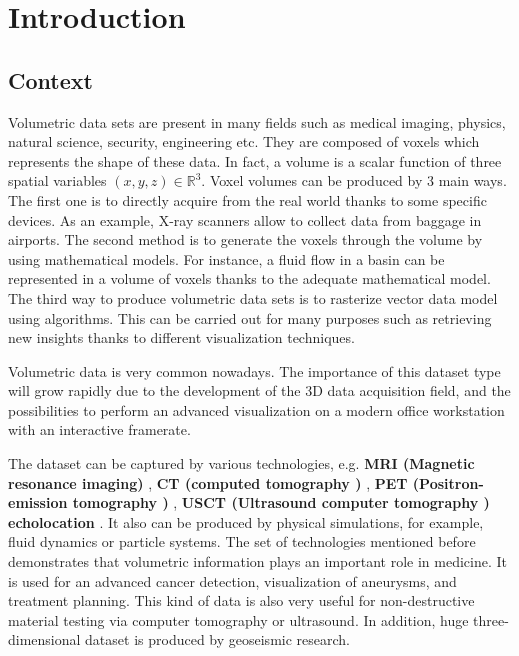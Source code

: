 
\chapter{Introduction} %

\label{Introduction} %


\newcommand{\keyword}[1]{\textbf{#1}}
\newcommand{\tabhead}[1]{\textbf{#1}}
\newcommand{\code}[1]{\texttt{#1}}
\newcommand{\file}[1]{\texttt{\bfseries#1}}
\newcommand{\option}[1]{\texttt{\itshape#1}}



\section{Context}

Volumetric data sets are present in many fields such as medical imaging, physics, natural science, security, engineering etc. They are composed of voxels which represents the shape of these data. In fact, a volume is a scalar function of three spatial variables $(x,y,z) \in \mathbb{R}^3$. Voxel volumes can be produced by 3 main ways. The first one is to directly acquire from the real world thanks to some specific devices. As an example, X-ray scanners allow to collect data from baggage in airports. The second method is to generate the voxels through the volume by using mathematical models. For instance, a fluid flow in a basin can be represented in a volume of voxels thanks to the adequate mathematical model. The third way to produce volumetric data sets is to  rasterize vector data model using algorithms. This can be carried out for many purposes such as retrieving new insights thanks to different visualization techniques.


Volumetric data is very common nowadays. The importance of this dataset type will grow rapidly due to the development of the 3D data acquisition field, and the possibilities to perform an advanced visualization on a modern office workstation with an interactive framerate.


The dataset can be captured by various technologies, e.g. \textbf{  MRI (Magnetic resonance imaging) } , \textbf{ CT (computed tomography ) }, \textbf{PET (Positron-emission tomography ) }, \textbf{ USCT (Ultrasound computer tomography ) echolocation }. It also can be produced by physical simulations, for example, fluid dynamics or particle systems. The set of technologies mentioned before demonstrates that volumetric information plays an important role in medicine. It is used for an advanced cancer detection, visualization of aneurysms, and treatment planning. This kind of data is also very useful for non-destructive material testing via computer tomography or ultrasound. In addition, huge three-dimensional dataset is produced by geoseismic research.


